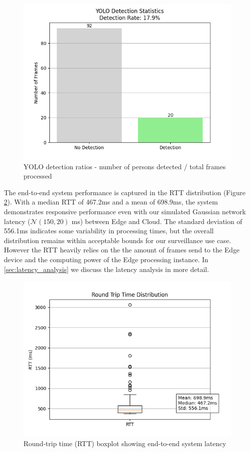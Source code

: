\documentclass[conference]{IEEEtran}
\begin{document}
\begin{figure}[h!]
    \centering
    \includegraphics[width=1\linewidth]{./res/evaluation_with_latencies/yolo_ratios.png}
    \caption{YOLO detection ratios - number of persons detected / total frames processed}
    \label{fig:yolo_ratios}
\end{figure}


The end-to-end system performance is captured in the RTT distribution (Figure \ref{fig:rtt_distribution}). With a median RTT of 467.2ms and a mean of 698.9ms, the system demonstrates responsive performance even with our simulated Gaussian network latency ($\mathcal{N}(150, 20)$ ms) between Edge and Cloud. The standard deviation of 556.1ms indicates some variability in processing times, but the overall distribution remains within acceptable bounds for our surveillance use case. However the RTT heavily relies on the the amount of frames send to the Edge device and the computing power of the Edge processing instance. In \ref {sec:latency_analysis} we discuss the latency analysis in more detail.

\begin{figure}[h!]
    \centering
    \includegraphics[width=1\linewidth]{./res/evaluation_with_latencies/rtt_distribution.png}
    \caption{Round-trip time (RTT) boxplot showing end-to-end system latency}
    \label{fig:rtt_distribution}
\end{figure}
\end{document}
